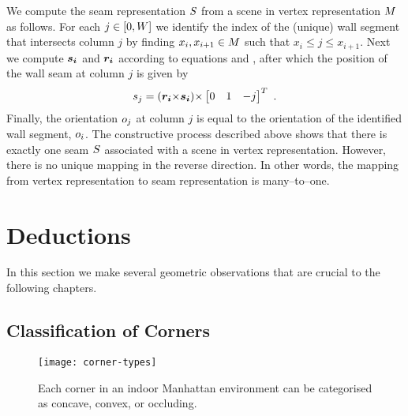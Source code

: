 We compute the seam representation $\Seam$ from a scene in vertex
representation $\Scene$ as follows. For each $j\in[0,\Width]$ we
identify the index of the (unique) wall segment that intersects column
$j$ by finding $x_i,x_{i+1}\in\Scene$ such that $x_i \leq j \leq
x_{i+1}$. Next we compute $\vect{s_i}$ and $\vect{r_i}$ according to
equations  and , after which the position of the
wall seam at column $j$ is given by
\begin{equation}
  \label{eq:seam-from-scene}
  \seam_j = (\vect{r_i} \cross \vect{s_i}) \cross
  \begin{bmatrix} 0 & 1 & -j \end{bmatrix}^T ~.
\end{equation}
Finally, the orientation $\WallOrient_j$ at column $j$ is equal to the
orientation of the identified wall segment, $\WallOrient_i$. The
constructive process described above shows that there is exactly one
seam $\Seam$ associated with a scene in vertex
representation. However, there is no unique mapping in the reverse
direction. In other words, the mapping from vertex representation to
seam representation is many--to--one.

\section{Deductions}
\label{sec:misc-geometry}

In this section we make several geometric observations that are
crucial to the following chapters.

\subsection{Classification of Corners}
\label{sec:corner-categories}

\begin{figure}[tb]%
  \centering
  \texttt{[image: corner-types]}
  \caption{Each corner in an indoor Manhattan environment can be
    categorised as concave, convex, or occluding.}
  \label{fig:corner-types}
\end{figure}

